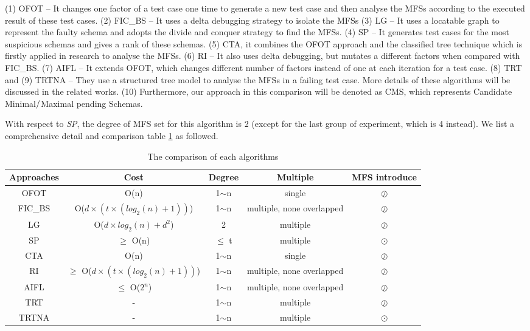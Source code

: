 \documentclass{sig-alternate-05-2015}
\begin{document}
{{{{(1) OFOT \cite{nie2011minimal} -- It changes one factor of a test case one time to generate a new test case and then analyse the MFSs according to the executed result of these test cases. (2) FIC\_BS \cite{zhang2011characterizing} -- It uses a delta debugging strategy to isolate the MFSs (3) LG \cite{martinez2008algorithms,martinez2009locating} -- It uses a locatable graph to represent the faulty schema and adopts the divide and conquer strategy to find the MFSs. (4) SP\cite{ghandehari2012identifying} -- It generates test cases for the most suspicious schemas and gives a rank of these schemas. (5) CTA\cite{shakya2012isolating}, it combines the OFOT approach and the classified tree technique which is firstly applied in research \cite{yilmaz2006covering}  to analyse the MFSs. (6) RI \cite{li2012improved} -- It also uses delta debugging, but mutates a different factors  when compared with FIC\_BS. (7) AIFL \cite{wang2010adaptive} -- It extends OFOT, which changes different number of factors instead of one at each iteration for a test case. (8) TRT \cite{niu2013identifying} and (9) TRTNA \cite{niu2013identifying} --  They use a structured tree model to analyse the MFSs in a failing test case.  More details of these algorithms will be discussed in the related works. (10) Furthermore, our approach in this comparison will be denoted as CMS, which represents Candidate Minimal$\//$Maximal pending Schemas.

With respect to \emph{SP}, the degree of MFS set for this algorithm is 2 (except for the last group of experiment, which is 4 instead). We list a comprehensive detail and comparison table \ref{comparison-metrics} as followed.

\begin{table}[htb]
  \caption{The comparison of each algorithms} \centering
  \label{comparison-metrics}
  \begin{tabular}{c|c|c|c|c}\hline
  \bfseries Approaches & \bfseries Cost & \bfseries Degree & \bfseries Multiple & \bfseries MFS introduce \\

  \hline
    OFOT & O(n)  & 1$\sim$n & single & $\oslash$ \\
    FIC\_BS & O($d \times (t \times (log_{2}(n) + 1))$) & 1$\sim$n & multiple, none overlapped  & $\oslash$ \\
    LG & O($d \times log_{2}(n) + d^{2}$)  & 2 &  multiple & $\oslash$ \\
    SP & $\geq$ O(n)  & $\leq$ t & multiple & $\odot$\\
    CTA & O(n)  & 1$\sim$n  & single & $\oslash$  \\
    RI & $\geq$ O($d \times (t \times (log_{2}(n) + 1))$)  & 1$\sim$n &  multiple, none overlapped  & $\oslash$  \\
    AIFL & $\leq$ O($2^{n}$)  & 1$\sim$n & multiple, none overlapped  & $\oslash$  \\
    TRT & -  & 1$\sim$n & multiple & $\oslash$  \\
    TRTNA   & - & 1$\sim$n & multiple & $\odot$  \\


\end{tabular}
\end{table}}}}}
\end{document}
